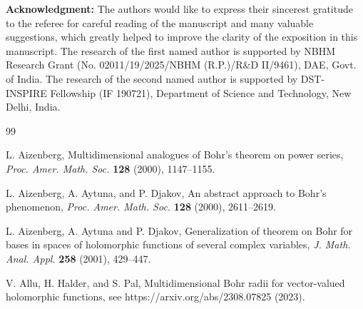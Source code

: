 \documentclass[a4paper,12pt]{amsart}
\theoremstyle{definition}
\begin{document}
\noindent\textbf{Acknowledgment:} 
The authors would like to express their sincerest gratitude to the referee for careful reading of the manuscript and many valuable suggestions, which greatly helped to improve the clarity of the exposition in this manuscript. 
The research of the first named author is supported by NBHM Research Grant (No. 02011/19/2025/NBHM (R.P.)/R\&D II/9461), DAE, Govt. of India.
The research of the second named author is supported by DST-INSPIRE Fellowship (IF 190721), Department of Science and Technology, New Delhi, India.


\begin{thebibliography}{99}

	
	 {\sc L. Aizenberg}, Multidimensional analogues of Bohr's theorem on power series, \textit{Proc. Amer. Math. Soc.} {\bf 128} (2000), 1147--1155.
	
	 {\sc L. Aizenberg, A. Aytuna}, and {\sc P. Djakov}, An abstract approach to Bohr's phenomenon, {\it Proc. Amer. Math. Soc.} {\bf 128} (2000), 2611--2619.
	
	
	 {\sc L. Aizenberg, A. Aytuna}  and {\sc P. Djakov}, Generalization of theorem on Bohr for bases in spaces of holomorphic functions of several complex variables, 
	{\it J. Math. Anal. Appl.} {\bf  258} (2001), 429--447.
	
	
	
	
	

	
	
	 {\sc V. Allu, H. Halder,} and {\sc S. Pal}, Multidimensional Bohr radii for vector-valued holomorphic functions, see https://arxiv.org/abs/2308.07825 (2023).
	

\end{thebibliography}
\end{document}
